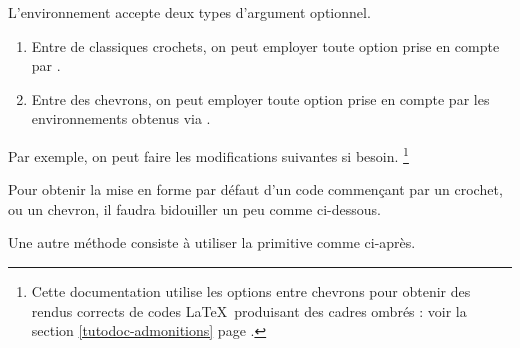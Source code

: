 \documentclass{tutodoc}
\begin{document}
\begin{tdocexa}[Personnaliser]
	L'environnement  accepte deux types d'argument optionnel.
	\begin{enumerate}
		\item Entre de classiques crochets, on peut employer toute option prise en compte par .

        \item Entre des chevrons, on peut employer toute option prise en compte par les environnements obtenus via .
	\end{enumerate}

	Par exemple, on peut faire les modifications suivantes si besoin.%
	\footnote{
		Cette documentation utilise les options entre chevrons pour obtenir des rendus corrects de codes \LaTeX\ produisant des cadres ombrés : voir la section \ref{tutodoc-admonitions} page \pageref{tutodoc-admonitions}.
	}

\end{tdocexa}

\medskip

\begin{tdocwarn}
    Pour obtenir la mise en forme par défaut d'un code commençant par un crochet, ou un chevron, il faudra bidouiller un peu comme ci-dessous.

    \smallskip

    Une autre méthode consiste à utiliser la primitive  comme ci-après.
\end{tdocwarn}
\end{document}
